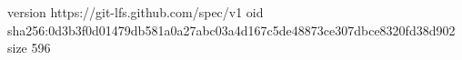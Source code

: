 version https://git-lfs.github.com/spec/v1
oid sha256:0d3b3f0d01479db581a0a27abc03a4d167c5de48873ce307dbce8320fd38d902
size 596

